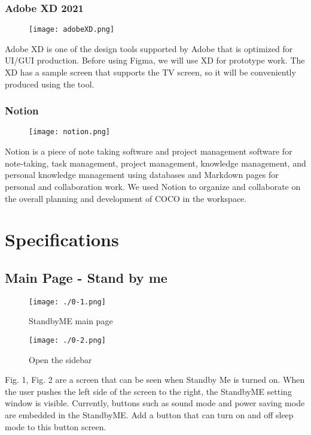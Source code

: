 \documentclass[conference]{IEEEtran}
\begin{document}
\subsubsection{Adobe XD 2021}
\par \begin{figure}[H]
\texttt{[image: adobeXD.png]}
\centering
\end{figure}
Adobe XD is one of the design tools supported by Adobe that is optimized for UI/GUI production. Before using Figma, we will use XD for prototype work. The XD has a sample screen that supports the TV screen, so it will be conveniently produced using the tool.
\vspace{1\baselineskip}
\subsubsection{Notion}
\par \begin{figure}[H]
\texttt{[image: notion.png]}
\centering
\end{figure}
Notion is a piece of note taking software and project management software for note-taking, task management, project management, knowledge management, and personal knowledge management using databases and Markdown pages for personal and collaboration work. We used Notion to organize and collaborate on the overall planning and development of COCO in the workspace.
\section{Specifications}
\subsection{Main Page - Stand by me}
\begin{figure}[H]
\texttt{[image: ./0-1.png]}
\centering
\caption{StandbyME main page}
\end{figure}

\begin{figure}[H]
\texttt{[image: ./0-2.png]}
\centering
\caption{Open the sidebar}
\end{figure}

Fig. 1, Fig. 2 are a screen that can be seen when Standby Me is turned on. When the user pushes the left side of the screen to the right, the StandbyME setting window is visible. Currently, buttons such as sound mode and power saving mode are embedded in the StandbyME. Add a button that can turn on and off sleep mode to this button screen.
\end{document}
